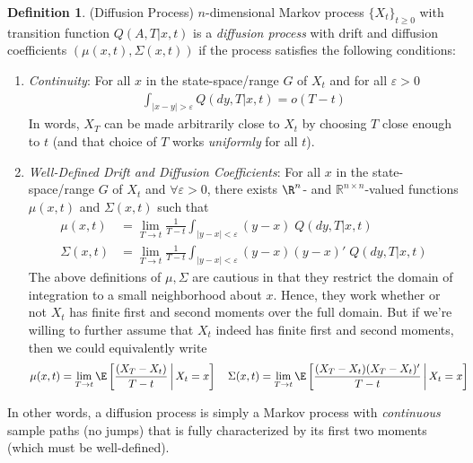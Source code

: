 \documentclass[12pt]{article}
\theoremstyle{plain}
\theoremstyle{definition}
\newtheorem{defn}[thm]{Definition}
\theoremstyle{remark}
\newcommand{\ra}{\rightarrow}
\newcommand{\Rnn}{\mathbb{R}^{n\times n}}
\begin{document}
\clearpage
\begin{defn}(Diffusion Process)
\label{defn:diffusion}
$n$-dimensional Markov process $\{X_t\}_{t\geq 0}$ with transition
function $Q(A,T|x,t)$ is a \emph{diffusion process} with drift and
diffusion coefficients $(\mu(x,t),\Sigma(x,t))$ if the process satisfies
the following conditions:
\begin{enumerate}[label=(\roman*)]
  \item \emph{Continuity}:
    For all $x$ in the state-space/range $G$ of $X_t$ and
    for all $\varepsilon>0$
    \begin{align*}
      \int_{|x-y|>\varepsilon}
      Q(dy,T|x,t)
      =
      o(T-t)
    \end{align*}
    In words, $X_T$ can be made arbitrarily close to $X_t$ by choosing
    $T$ close enough to $t$ (and that choice of $T$ works
    \emph{uniformly} for all $t$).

  \item
    \emph{Well-Defined Drift and Diffusion Coefficients}:
    For all $x$ in the state-space/range $G$ of $X_t$ and
    $\forall\varepsilon>0$, there exists $\R^n$- and
    $\Rnn$-valued functions $\mu(x,t)$ and $\Sigma(x,t)$ such
    that
    \begin{align*}
      \mu(x,t)
      &=
      \lim_{T\ra t}
      \frac{1}{T-t}
      \int_{|y-x|<\varepsilon}
      (y-x)
      \;Q(dy,T|x,t)
      \\
      \Sigma(x,t)
      &=
      \lim_{T\ra t}
      \frac{1}{T-t}
      \int_{|y-x|<\varepsilon}
      (y-x)(y-x)'
      \;Q(dy,T|x,t)
    \end{align*}
    The above definitions of $\mu,\Sigma$ are cautious in that they
    restrict the domain of integration to a small neighborhood about
    $x$. Hence, they work whether or not $X_t$ has finite first and
    second moments over the full domain. But if we're willing to further
    assume that $X_t$ indeed has finite first and second moments, then
    we could equivalently write
    \begin{align*}
      \mu(x,t)
      &=
      \lim_{T\ra t}
      \E\left[
        \frac{(X_T-X_t)}{T-t}
        \,\bigg|\,
       X_t=x
      \right]
      \quad
      \Sigma(x,t)
      =
      \lim_{T\ra t}
      \E\left[
        \frac{(X_T-X_t)(X_T-X_t)'}{T-t}
        \,\bigg|\,
        X_t=x
      \right]
    \end{align*}
\end{enumerate}
In other words, a diffusion process is simply a Markov process with
\emph{continuous} sample paths (no jumps) that is fully characterized by
its first two moments (which must be well-defined).
\end{defn}
\end{document}
